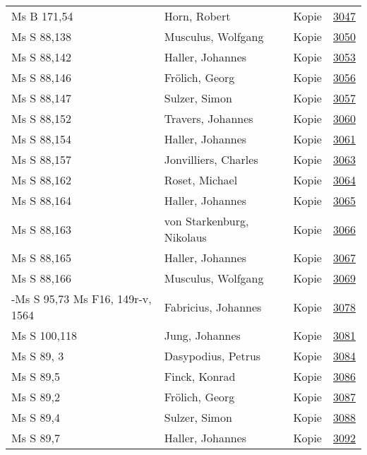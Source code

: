 \documentclass[10pt,a4paper,landscape]{report}
\begin{document}
\begin{longtable}{p{16cm}p{4cm}lr}
Ms B 171,54	&	Horn, Robert	&	Kopie	&	\href{http://130.60.24.72/assignment/3047}{3047}\\
Ms S 88,138	&	Musculus, Wolfgang	&	Kopie	&	\href{http://130.60.24.72/assignment/3050}{3050}\\
Ms S 88,142	&	Haller, Johannes	&	Kopie	&	\href{http://130.60.24.72/assignment/3053}{3053}\\
Ms S 88,146	&	Frölich, Georg	&	Kopie	&	\href{http://130.60.24.72/assignment/3056}{3056}\\
Ms S 88,147	&	Sulzer, Simon	&	Kopie	&	\href{http://130.60.24.72/assignment/3057}{3057}\\
Ms S 88,152	&	Travers, Johannes	&	Kopie	&	\href{http://130.60.24.72/assignment/3060}{3060}\\
Ms S 88,154	&	Haller, Johannes	&	Kopie	&	\href{http://130.60.24.72/assignment/3061}{3061}\\
Ms S 88,157	&	Jonvilliers, Charles	&	Kopie	&	\href{http://130.60.24.72/assignment/3063}{3063}\\
Ms S 88,162	&	Roset, Michael	&	Kopie	&	\href{http://130.60.24.72/assignment/3064}{3064}\\
Ms S 88,164	&	Haller, Johannes	&	Kopie	&	\href{http://130.60.24.72/assignment/3065}{3065}\\
Ms S 88,163	&	von Starkenburg, Nikolaus	&	Kopie	&	\href{http://130.60.24.72/assignment/3066}{3066}\\
Ms S 88,165	&	Haller, Johannes	&	Kopie	&	\href{http://130.60.24.72/assignment/3067}{3067}\\
Ms S 88,166	&	Musculus, Wolfgang	&	Kopie	&	\href{http://130.60.24.72/assignment/3069}{3069}\\
-Ms S 95,73 Ms F16, 149r-v, 1564	&	Fabricius, Johannes	&	Kopie	&	\href{http://130.60.24.72/assignment/3078}{3078}\\
Ms S 100,118	&	Jung, Johannes	&	Kopie	&	\href{http://130.60.24.72/assignment/3081}{3081}\\
Ms S 89, 3	&	Dasypodius, Petrus	&	Kopie	&	\href{http://130.60.24.72/assignment/3084}{3084}\\
Ms S 89,5	&	Finck, Konrad	&	Kopie	&	\href{http://130.60.24.72/assignment/3086}{3086}\\
Ms S 89,2	&	Frölich, Georg	&	Kopie	&	\href{http://130.60.24.72/assignment/3087}{3087}\\
Ms S 89,4	&	Sulzer, Simon	&	Kopie	&	\href{http://130.60.24.72/assignment/3088}{3088}\\
Ms S 89,7	&	Haller, Johannes	&	Kopie	&	\href{http://130.60.24.72/assignment/3092}{3092}\\

\end{longtable}
\end{document}
